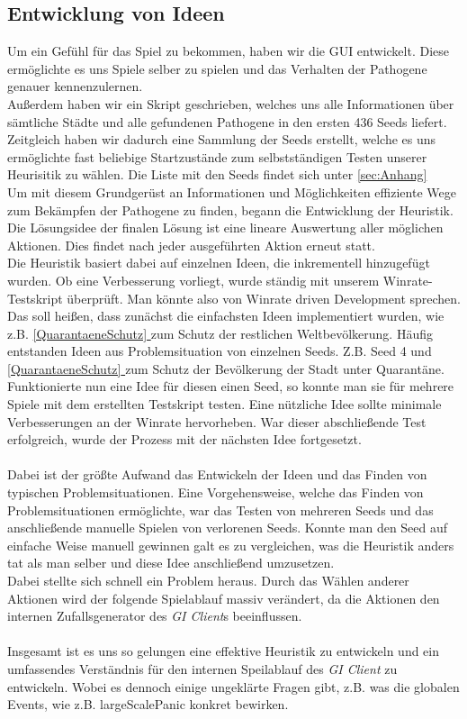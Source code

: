 \documentclass{article}
\newcommand{\fullref}[1]{\hyperref[{#1}]{\ref{#1} \nameref{#1}}} %
\newcommand{\gquote}[1]{\glqq #1\grqq} %
\let\oldgls\gls
\renewcommand{\gls}[1]{\emph{\oldgls{#1}}} %
\begin{document}
\subsection{Entwicklung von Ideen}
Um ein Gefühl für das Spiel zu bekommen, haben wir die GUI entwickelt. Diese ermöglichte es uns Spiele selber zu spielen und das Verhalten der Pathogene genauer kennenzulernen. \\
Außerdem haben wir ein Skript geschrieben, welches uns alle Informationen über sämtliche Städte und alle gefundenen Pathogene in den ersten 436 Seeds liefert. Zeitgleich haben wir dadurch eine Sammlung der Seeds erstellt, welche es uns ermöglichte fast beliebige Startzustände zum selbstständigen Testen unserer Heurisitik zu wählen. Die Liste mit den Seeds findet sich unter \fullref{sec:Anhang}\\
Um mit diesem Grundgerüst an Informationen und Möglichkeiten effiziente Wege zum Bekämpfen der Pathogene zu finden, begann die Entwicklung der Heuristik. \\
Die Lösungsidee der finalen Lösung ist eine lineare Auswertung aller möglichen Aktionen. Dies findet nach jeder ausgeführten Aktion erneut statt. \\
Die Heuristik basiert dabei auf einzelnen Ideen, die inkrementell hinzugefügt wurden. Ob eine Verbesserung vorliegt, wurde ständig mit unserem Winrate-Testskript überprüft. Man könnte also von \gquote{Winrate driven Development} sprechen. Das soll heißen, dass zunächst die einfachsten Ideen implementiert wurden, wie z.B. \fullref{QuarantaeneSchutz} zum Schutz der restlichen Weltbevölkerung. Häufig entstanden Ideen aus Problemsituation von einzelnen Seeds. Z.B. Seed 4 und \fullref{QuarantaeneSchutz} zum Schutz der Bevölkerung der Stadt unter Quarantäne. \\ Funktionierte nun eine Idee für diesen einen Seed, so konnte man sie für mehrere Spiele mit dem erstellten Testskript testen. Eine nützliche Idee sollte minimale Verbesserungen an der Winrate hervorheben.
War dieser abschließende Test erfolgreich, wurde der Prozess mit der nächsten Idee fortgesetzt. \\\\
Dabei ist der größte Aufwand das Entwickeln der Ideen und das Finden von typischen Problemsituationen. Eine Vorgehensweise, welche das Finden von Problemsituationen ermöglichte, war das Testen von mehreren Seeds und das anschließende manuelle Spielen von verlorenen Seeds. 
Konnte man den Seed auf einfache Weise manuell gewinnen galt es zu vergleichen, was die Heuristik anders tat als man selber und diese Idee anschließend umzusetzen. \\ 
Dabei stellte sich schnell ein Problem heraus. Durch das Wählen anderer Aktionen wird der folgende Spielablauf massiv verändert, da die Aktionen den internen Zufallsgenerator des \gls{GI Client}s beeinflussen. \\\\
Insgesamt ist es uns so gelungen eine effektive Heuristik zu entwickeln und ein umfassendes Verständnis für den internen Speilablauf des \gls{GI Client} zu entwickeln. Wobei es dennoch einige ungeklärte Fragen gibt, z.B. was die \gquote{globalen Events}, wie z.B. \gquote{largeScalePanic} konkret bewirken.
\newpage
\end{document}
